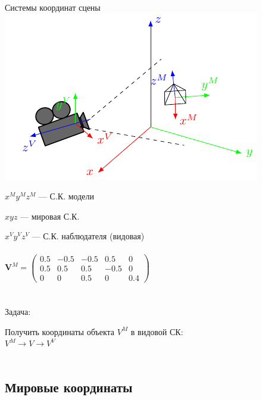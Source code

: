 \documentclass[10pt]{beamer}
\begin{document}
	\begin{frame}{Системы координат сцены}
		{
			\includegraphics{projectionPL.pdf}
		}
		{
			$x^My^Mz^M$  --- С.К. модели
			
			$xyz$  --- мировая С.К.
			
			$x^Vy^Vz^V$  --- С.К. наблюдателя (видовая) \\ ~ \\
			
			$\mathbf V^M
			=
			\begin{pmatrix}
				0.5 & -0.5 &-0.5& 0.5 &0\\
				0.5& 0.5 & 0.5 &-0.5& 0 \\
				0 &  0 &  0.5 &   0 & 0.4
			\end{pmatrix} $\\ ~ \\ ~ \\ 
			
			Задача:
			
			Получить координаты объекта $V^M$ в видовой СК: \\
			
			$V^M \rightarrow V \rightarrow V^V$ \\ ~ \\
			
			
		}
		
	\end{frame}
	
	\subsection{Мировые координаты}
	
\end{document}
